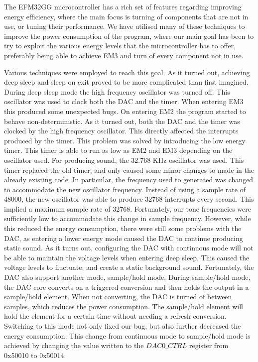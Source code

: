 The EFM32GG microcontroller has a rich set of features regarding improving energy efficiency, where the main focus is turning of components that are not in use, or tuning their performance. We have utilised many of these techniques to improve the power consumption of the program, where our main goal has been to try to exploit the various energy levels that the microcontroller has to offer, preferably being able to achieve EM3 and turn of every component not in use. 

Various techniques were employed to reach this goal. As it turned out, achieving deep sleep and sleep on exit proved to be more complicated than first imagined. During deep sleep mode the high frequency oscillator was turned off. This oscillator was used to clock both the DAC and the timer. When entering EM3 this produced some unexpected bugs. On entering EM2 the program started to behave non-deterministic. As it turned out, both the DAC and the timer was clocked by the high frequency oscillator. This directly affected the interrupts produced by the timer. This problem was solved by introducing the low energy timer. This timer is able to run as low as EM2 and EM3 depending on the oscillator used. For producing sound, the 32.768 KHz oscillator was used. This timer replaced the old timer, and only caused some minor changes to made in the already existing code. In particular, the frequency used to generated was changed to accommodate the new oscillator frequency. Instead of  using a sample rate of 48000, the new oscillator was able to produce 32768 interrupts every second. This implied a maximum sample rate of 32768. Fortunately, our tone frequencies were sufficiently low to accommodate this change in sample frequency. However, while this reduced the energy consumption, there were still some problems with the DAC, as entering a lower energy mode caused the DAC to continue producing static sound. As it turns out, configuring the DAC with continuous mode will not be able to maintain the voltage levels when entering deep sleep. This caused the voltage levels to fluctuate, and create a static background sound. Fortunately, the DAC also support another mode, sample/hold mode. During sample/hold mode, the DAC core converts on a triggered conversion and then holds the output in a sample/hold element. When not converting, the DAC is turned of between samples, which reduces the power consumption. The sample/hold element will hold the element for a certain time without needing a refresh conversion\cite{EFM32GG-rm}. Switching to this mode not only fixed our bug, but also further decreased the energy consumption. This change from continuous mode to sample/hold mode is achieved by changing the value written to the $DAC0\_CTRL$ register from 0x50010 to 0x50014. 


